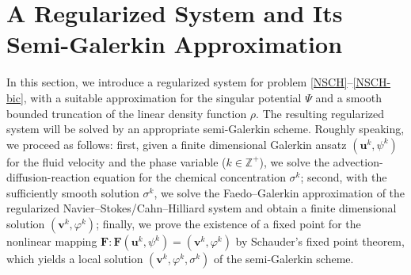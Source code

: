 \documentclass[11pt,reqno]{amsart}
\def\uu{\bm{u}}
\begin{document}
\section{A Regularized System and Its Semi-Galerkin Approximation}
\label{modif-sys}
\setcounter{equation}{0}

In this section, we introduce a regularized system for problem \eqref{NSCH}--\eqref{NSCH-bic}, with a suitable approximation for the singular potential $\Psi$ and a smooth bounded truncation of the linear density function $\rho$. The resulting regularized system will be solved by an appropriate semi-Galerkin scheme. Roughly speaking, we proceed as follows: first, given a finite dimensional Galerkin ansatz $(\uu^k,\psi^k)$ for the fluid velocity and the phase variable ($k\in \mathbb{Z}^+$), we solve the advection-diffusion-reaction equation for the chemical concentration $\sigma^k$; second, with the sufficiently smooth solution $\sigma^k$, we solve the Faedo--Galerkin approximation of the regularized Navier--Stokes/Cahn--Hilliard system and obtain a finite dimensional solution $(\bm{v}^k,\varphi^k)$; finally, we prove the existence of a fixed point for the nonlinear mapping $\mathbf{F}: \mathbf{F}(\bm{u}^k,\psi^k)= (\bm{v}^k, \varphi^k)$
by Schauder's fixed point theorem, which yields a local solution $(\bm{v}^k, \varphi^k, \sigma^k)$ of the semi-Galerkin scheme.

\end{document}
